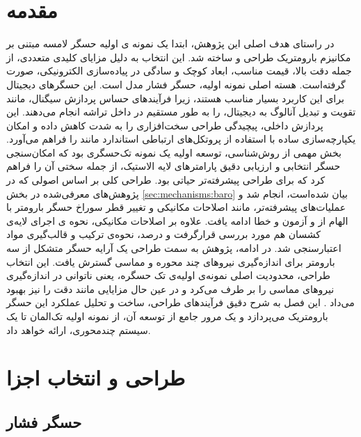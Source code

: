 \section{مقدمه}
در راستای هدف اصلی این پژوهش، ابتدا یک نمونه ی اولیه حسگر لامسه مبتنی بر مکانیزم بارومتریک  طراحی و ساخته شد. این انتخاب به دلیل مزایای کلیدی متعددی، از جمله دقت بالا، قیمت مناسب، ابعاد کوچک و سادگی در پیاده‌سازی الکترونیکی، صورت گرفته‌است. هسته اصلی نمونه اولیه، حسگر فشار 
 مدل
   است. این حسگرهای دیجیتال برای این کاربرد بسیار مناسب هستند، زیرا فرآیندهای حساس پردازش سیگنال، مانند تقویت و تبدیل آنالوگ به دیجیتال، را به طور مستقیم در داخل تراشه انجام می‌دهند. این پردازش داخلی، پیچیدگی طراحی سخت‌افزاری را به شدت کاهش داده و امکان یکپارچه‌سازی ساده با استفاده از پروتکل‌های ارتباطی استاندارد مانند 
    را فراهم می‌آورد. بخش مهمی از روش‌شناسی، توسعه اولیه یک نمونه تک‌حسگری بود که امکان‌سنجی حسگر انتخابی و ارزیابی دقیق پارامترهای لایه الاستیک، از جمله سختی آن را فراهم کرد که برای طراحی پیشرفته‌تر حیاتی بود. طراحی کلی بر اساس اصولی که در پژوهش‌های معرفی‌شده در بخش \ref{sec:mechanisms:baro}
 بیان شده‌است، انجام شد و عملیات‌های پیشرفته‌تر، مانند اصلاحات مکانیکی و تغییر قطر سوراخ حسگر بارومتر با الهام از 
 \cite{koiva_barometer-based_2020}
 و آزمون و خطا ادامه یافت. علاوه بر اصلاحات مکانیکی، نحوه ی اجرای لایه‌ی کشسان هم مورد بررسی قرار‌گرفت و درصد، نحوه‌ی ترکیب و قالب‌گیری مواد اعتبار‌سنجی شد.
 در ادامه، پژوهش به سمت طراحی یک آرایه حسگر متشکل از سه بارومتر برای اندازه‌گیری نیروهای چند ‌محوره و مماسی گسترش یافت. این انتخاب طراحی، محدودیت اصلی نمونه‌ی اولیه‌ی تک حسگره، یعنی ناتوانی در اندازه‌گیری نیرو‌های مماسی را بر طرف می‌کرد و در عین حال مزایایی مانند دقت را نیز بهبود می‌داد
 \cite{kim_barotac_2022}.
این فصل به شرح دقیق فرآیندهای طراحی، ساخت و تحلیل عملکرد این حسگر بارومتریک می‌پردازد و یک مرور جامع از توسعه آن، از نمونه اولیه تک‌المان تا یک سیستم چندمحوری، ارائه خواهد داد.

\section{طراحی و انتخاب اجزا}
\subsection{حسگر فشار }

